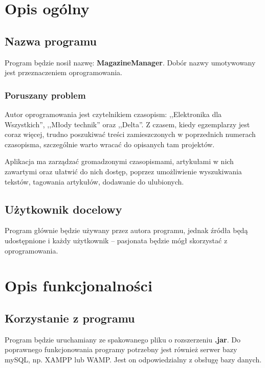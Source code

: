 \section{Opis ogólny}
\subsection{Nazwa programu}
Program będzie nosił nazwę: \textbf{MagazineManager}. Dobór nazwy umotywowany jest przeznaczeniem oprogramowania. 

\subsubsection{Poruszany problem}
Autor oprogramowania jest czytelnikiem czasopism: ,,Elektronika dla Wszystkich'', ,,Młody technik'' oraz ,,Delta''. Z czasem, kiedy egzemplarzy jest coraz więcej, trudno poszukiwać treści zamieszczonych w poprzednich numerach czasopisma, szczególnie warto wracać do opisanych tam projektów.

Aplikacja ma zarządzać gromadzonymi czasopismami, artykułami w nich zawartymi oraz ułatwić do nich dostęp, poprzez umożliwienie wyszukiwania tekstów, tagowania artykułów, dodawanie do ulubionych. 

\subsection{Użytkownik docelowy}
Program głównie będzie używany przez autora programu, jednak źródła będą udostępnione i każdy użytkownik -- pasjonata będzie mógł skorzystać z oprogramowania.

\section{Opis funkcjonalności}
\subsection{Korzystanie z programu}
Program będzie uruchamiany ze spakowanego pliku o rozszerzeniu \textbf{.jar}. Do poprawnego funkcjonowania programy potrzebny jest również serwer bazy mySQL, np. XAMPP lub WAMP. Jest on odpowiedzialny z obsługę bazy danych.

